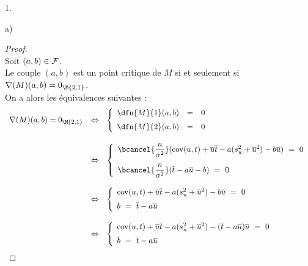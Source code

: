 \documentclass[11pt]{article}%
\begin{document}
\begin{noliste}{1.}
\begin{noliste}{a)}
  \begin{proof}~\\
   Soit $(a,b) \in {\cal F}$.\\
   Le couple $(a,b)$ est un point critique de $M$ si et 
    seulement si $\nabla(M)(a,b) = 0_{\M{2,1}}$.\\
    On a alors les équivalences suivantes :
    \[
     \begin{array}{rcl}
      \nabla(M)(a,b) = 0_{\M{2,1}} & \Leftrightarrow &
      \left\{
      \begin{array}{rcl}
        \dfn{M}{1}(a,b) &=& 0\\[.2cm]
        \dfn{M}{2}(a,b) &=& 0
      \end{array}
    \right. 
    \\[.8cm]
    & \Leftrightarrow &
    \left\{
      \begin{array}{l}
        \bcancel{\dfrac{n}{\sigma^2}}(\text{cov}(u,t) + 
	\overline{u}\overline{t} - a(s_u^2 + 
	\overline{u}^2)-b\overline{u}) \ = \ 0
        \\[.4cm]
        \bcancel{\dfrac{n}{\sigma^2}}(\overline{t}-a\overline{u}-b)
        \ = \ 0
      \end{array}
     \right.
     \\[1cm]
     & \Leftrightarrow &
    \left\{
      \begin{array}{l}
        \text{cov}(u,t)+\overline{u}\overline{t}-a(s_u^2
        +\overline{u}^2)-b\overline{u} 
        \ = \ 0 
        \\[.2cm]
        b \ = \ \overline{t}-a\overline{u}
      \end{array}
     \right.
     \\[.8cm]
    & \Leftrightarrow &
    \left\{
      \begin{array}{l}
        \text{cov}(u,t)+\overline{u}\overline{t}-a(s_u^2
        +\overline{u}^2)-(\overline{t}-a\overline{u})\overline{u} 
        \ = \ 0 
        \\[.2cm]
        b \ = \ \overline{t}-a\overline{u}
      \end{array}
     \right.
     \end{array}
    \]
    

\end{proof}
\end{noliste}
\end{noliste}
\end{document}

